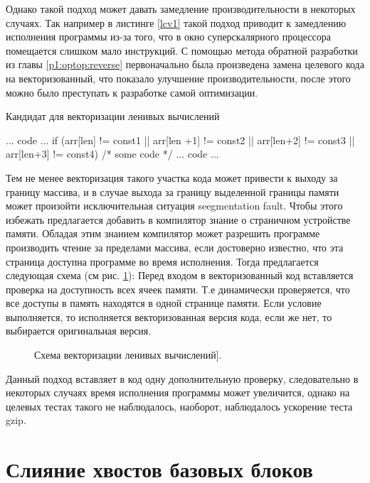  Однако такой подход может давать замедление производительности в некоторых случаях.
 Так например в листинге \ref{lcv1} такой подход приводит к замедлению исполнения программы из-за того, что в окно суперскалярного процессора помещается слишком мало инструкций. С помощью метода обратной разработки из главы \ref{p1:optop:reverse} первоначально была произведена замена целевого кода на векторизованный, что показало улучшение производительности, после этого можно было преступать к разработке самой оптимизации.
 
 \begin{ListingEnv}[!h]
 	\captiondelim{ } %
 	\caption{Кандидат для векторизации ленивых вычислений}\label{lcv1}
 	
 	\begin{Verb}
... code ...
if (arr[len] != const1 || arr[len +1] != const2 
	|| arr[len+2] != const3  || arr[len+3] != const4) {
		/* some code */
	}
... code ...
 	\end{Verb}
 \end{ListingEnv}
 
 Тем не менее векторизация такого участка кода может привести к выходу за границу массива, и в случае выхода за границу выделенной границы памяти может произойти исключительная ситуация seegmentation fault. Чтобы этого избежать предлагается добавить в компилятор знание о страничном устройстве памяти. Обладая этим знанием компилятор может разрешить программе производить чтение за пределами массива, если достоверно известно, что эта страница доступна  программе во время исполнения. Тогда предлагается следующая схема (см рис. \ref{lcv2}):
Перед входом в векторизованный код вставляется проверка на доступность всех ячеек памяти. Т.е  динамически проверяется, что все доступы в память находятся в одной странице памяти. Если условие выполняется, то исполняется векторизованная версия кода, если же нет, то выбирается оригинальная версия.
 
 \begin{figure}[htbp]
 	\centering
 	
 	\caption{Схема векторизации ленивых вычислений].}
 	\label{lcv2}
 \end{figure}
 
 Данный подход вставляет в код одну дополнительную проверку, следовательно в некоторых случаях время исполнения программы может увеличится, однако на целевых тестах такого не наблюдалось, наоборот, наблюдалось ускорение теста gzip.
\section{Слияние хвостов базовых блоков} 

